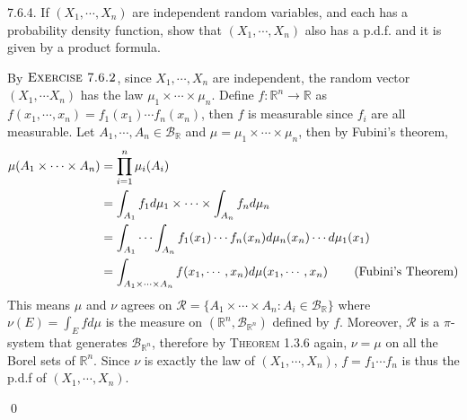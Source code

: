 \begin{exercise}7.6.4. If $(X_1,\cdots, X_n)$ are independent random variables, and each has a probability density function, show that $(X_1,\cdots, X_n)$ also has a p.d.f. and it
is given by a product formula.
\end{exercise}
\begin{answer}
By $\textsc{Exercise 7.6.2}$, since $X_1,\cdots,X_n$ are independent, the random vector $(X_1,\cdots X_n)$ has the law $\mu_1\times\cdots\times\mu_n$. Define $f:\mathbb{R}^n\rightarrow\mathbb{R}$ as $f(x_1,\cdots,x_n)=f_1(x_1)\cdots f_n(x_n)$, then $f$ is measurable since $f_i$ are all measurable. Let $A_1,\cdots,A_n\in\mathcal{B}_\mathbb{R}$ and $\mu=\mu_1\times\cdots\times\mu_n$, then by Fubini's theorem,
\begin{equation*}
    \begin{aligned}
        \mu(A_1\times\cdots\times A_n)&=\prod_{i=1}^n\mu_i(A_i)\\
        &=\int_{A_1}f_1d\mu_1\times\cdots\times\int_{A_n}f_nd\mu_n\\
        &=\int_{A_1}\cdots\int_{A_n}f_1(x_1)\cdots f_n(x_n)d\mu_n(x_n)\cdots d\mu_1(x_1)\\
        &=\int_{A_1\times\cdots\times A_n}f(x_1,\cdots,x_n)d\mu(x_1,\cdots,x_n) \hspace{0.75cm}\text{(Fubini's Theorem)}
    \end{aligned}
\end{equation*}
This means $\mu$ and $\nu$  agrees on $\mathcal{R}=\{A_1\times\cdots\times A_n:A_i\in\mathcal{B}_{\mathbb{R}}\}$ where $\nu(E)=\int_Efd\mu$ is the measure on $(\mathbb{R}^n, \mathcal{B}_{\mathbb{R}^n})$ defined by $f$. Moreover, $\mathcal{R}$ is a $\pi$-system that generates $\mathcal{B}_{\mathbb{R}^n}$, therefore by \textsc{Theorem 1.3.6} again, $\nu=\mu$ on all the Borel sets of $\mathbb{R}^n$. Since $\nu$ is exactly the law of $(X_1,\cdots ,X_n)$, $f=f_1\cdots f_n$ is thus the p.d.f of $(X_1,\cdots,X_n)$.
\end{answer}\qed \qquad

